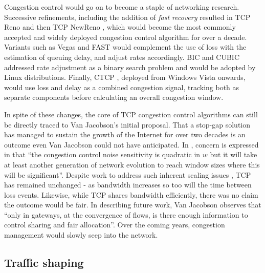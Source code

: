 Congestion control would go on to become a staple of networking research. Successive refinements, including the addition of \textit{fast recovery} resulted in \ac{TCP} Reno \cite{Stevens:1997p466} and then \ac{TCP} NewReno \cite{Paxson:1999p467}, which would become the most commonly accepted and widely deployed congestion control algorithm for over a decade. Variants such as Vegas \cite{Brakmo:1994p468} and \ac{FAST} \cite{Wei:2006p469} would complement the use of loss with the estimation of queuing delay, and adjust rates accordingly. \ac{BIC} and CUBIC \cite{Xu:2004p470,Ha:2008p471} addressed rate adjustment as a binary search problem and would be adopted by Linux distributions. Finally, \ac{CTCP} \cite{Zhang:2012p472}, deployed from Windows Vista onwards, would use loss and delay as a combined congestion signal, tracking both as separate components before calculating an overall congestion window.

In spite of these changes, the core of \ac{TCP} congestion control algorithms can still be directly traced to Van Jacobson's initial proposal. 
That a stop-gap solution has managed to sustain the growth of the Internet for over two decades is an outcome even Van Jacobson could not have anticipated. 
In \cite{Jacobson:1988p398}, concern is expressed in that ``the congestion control noise sensitivity is quadratic in $w$ but it will take at least another generation of network evolution to reach window sizes where this will be significant''. 
Despite work to address such inherent scaling issues \cite{Mathis:2009p309,Kelly:2003p475}, \ac{TCP} has remained unchanged - as bandwidth increases so too will the time between loss events.
Likewise, while \ac{TCP} shares bandwidth efficiently, there was no claim the outcome would be fair. In describing future work, Van Jacobson observes that ``only in gateways, at the convergence of flows, is there enough information to control sharing and fair allocation''. 
Over the coming years, congestion management would slowly seep into the network.




\subsection{Traffic shaping}
\label{sec:resourcepooling:shaping}

